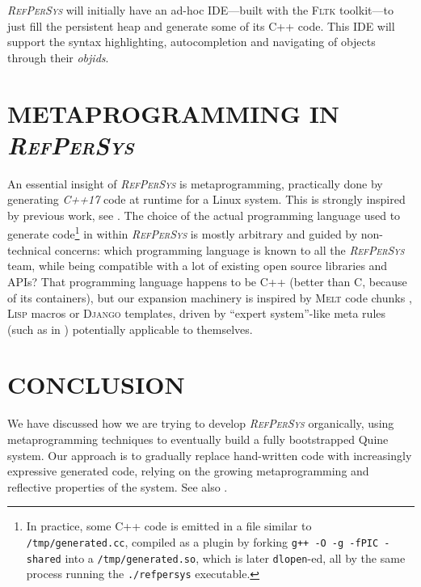 \documentclass{ecai}
\newcommand{\RefPerSys}{{\textit{\textsc{RefPerSys}}}}
\begin{document}
{\RefPerSys} will initially have an ad-hoc IDE---built with the \textsc{Fltk}
toolkit---to just fill the persistent heap and generate some of its C++
code. This IDE will support the syntax highlighting, autocompletion and
navigating of objects through their \emph{objids}.


\section{METAPROGRAMMING IN \RefPerSys}
\label{sec:metaprogramming}

An essential insight of {\RefPerSys} is metaprogramming, practically
done by generating \emph{C++17} code at runtime for a Linux
system. This is strongly inspired by previous work, see
\cite{Pitrat:1996:FGCS, Pitrat:2009:ArtifBeings,
  Starynkevitch:2019:bismon-draft, Starynkevitch-DSL2011,
  Starynkevitch:2007:Multistage}. The choice of the actual programming
language used to generate code\footnote{In practice, some C++ code is
emitted in a file similar to \texttt{/tmp/generated.cc}, compiled as a
plugin by forking \texttt{g++ -O -g -fPIC -shared} into a
\texttt{/tmp/generated.so}, which is later \texttt{dlopen}-ed, all by
the same process running the \texttt{./refpersys} executable.} in
within {\RefPerSys} is mostly arbitrary and guided by non-technical
concerns: which programming language is known to all the {\RefPerSys}
team, while being compatible with a lot of existing open source
libraries and APIs? That programming language happens to be C++
(better than C, because of its containers), but our
expansion machinery is inspired by \textsc{Melt} code chunks
\cite{Starynkevitch-DSL2011}, \textsc{Lisp} macros
\cite{Queinnec:1996:LSP} or \textsc{Django} templates, driven by
``expert system''-like meta rules (such as in \cite{Pitrat:1996:FGCS}) potentially applicable to themselves.



\bigskip

\section{CONCLUSION}
We have discussed how we are trying to develop {\RefPerSys} organically,
using metaprogramming techniques to eventually build a fully bootstrapped
Quine system. Our approach is to gradually replace hand-written code with
increasingly expressive generated code, relying on the growing metaprogramming
and reflective properties of the system. See also \cite{starynkevitch:2019:refpersys-design}.
\end{document}
